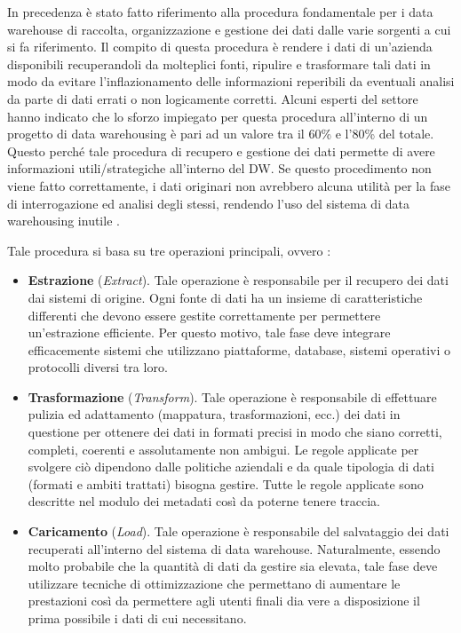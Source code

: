 In precedenza è stato fatto riferimento alla procedura fondamentale per i data warehouse di raccolta, organizzazione e gestione dei dati dalle varie sorgenti a cui si fa riferimento. Il compito di questa procedura è rendere i dati di un'azienda disponibili recuperandoli da molteplici fonti, ripulire e trasformare tali dati in modo da evitare l'inflazionamento delle informazioni reperibili da eventuali analisi da parte di dati errati o non logicamente corretti. Alcuni esperti del settore hanno indicato che lo sforzo impiegato per questa procedura all'interno di un progetto di data warehousing è pari ad un valore tra il 60\% e l'80\% del totale. Questo perché tale procedura di recupero e gestione dei dati permette di avere informazioni utili/strategiche all'interno del DW. Se questo procedimento non viene fatto correttamente, i dati originari non avrebbero alcuna utilità per la fase di interrogazione ed analisi degli stessi, rendendo l'uso del sistema di data warehousing inutile \cite{researchgate_etl_process}.

Tale procedura si basa su tre operazioni principali, ovvero \cite{sciencedirect_data_warehouse_model}:
\begin{itemize}
    \item \textbf{Estrazione} (\textit{Extract}). Tale operazione è responsabile per il recupero dei dati dai sistemi di origine. Ogni fonte di dati ha un insieme di caratteristiche differenti che devono essere gestite correttamente per permettere un'estrazione efficiente. Per questo motivo, tale fase deve integrare efficacemente sistemi che utilizzano piattaforme, database, sistemi operativi o protocolli diversi tra loro.
    \item \textbf{Trasformazione} (\textit{Transform}). Tale operazione è responsabile di effettuare pulizia ed adattamento (mappatura, trasformazioni, ecc.) dei dati in questione per ottenere dei dati in formati precisi in modo che siano corretti, completi, coerenti e assolutamente non ambigui. Le regole applicate per svolgere ciò dipendono dalle politiche aziendali e da quale tipologia di dati (formati e ambiti trattati) bisogna gestire. Tutte le regole applicate sono descritte nel modulo dei metadati così da poterne tenere traccia.
    \item \textbf{Caricamento} (\textit{Load}). Tale operazione è responsabile del salvataggio dei dati recuperati all'interno del sistema di data warehouse. Naturalmente, essendo molto probabile che la quantità di dati da gestire sia elevata, tale fase deve utilizzare tecniche di ottimizzazione che permettano di aumentare le prestazioni così da permettere agli utenti finali dia vere a disposizione il prima possibile i dati di cui necessitano.
\end{itemize}


